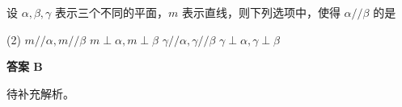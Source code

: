 \begin{choice}[source={2025年雅礼月考八}, topic={面面平行的判定}]
设 $\alpha, \beta, \gamma$ 表示三个不同的平面，$m$ 表示直线，则下列选项中，使得 $\alpha // \beta$ 的是
\begin{tasks}(2)
	\task $m // \alpha, m // \beta$
	\task $m \perp \alpha, m \perp \beta$
	\task $\gamma // \alpha, \gamma // \beta$
	\task $\gamma \perp \alpha, \gamma \perp \beta$
\end{tasks}
\end{choice}
\begin{choice-sol}
\textbf{答案 B}

待补充解析。
\end{choice-sol}

